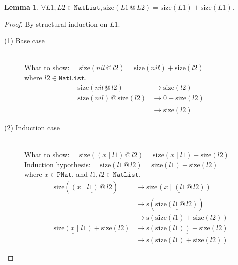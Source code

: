 \documentclass[12pt, a4paper]{article}
\newtheorem{lemma}[theorem]{Lemma}
\newcommand{\rel}[1]{\mathrel{#1}}
\newcommand{\rmx}[1]{\mathrm{#1}}
\newcommand{\larrow}{\longrightarrow}
\newcommand{\under}{\underline}
\begin{document}
\begin{lemma}
\label{lm1}
$\forall L1, L2 \in \mathtt{NatList}, \rmx{size}(L1 \rel{@} L2) = \rmx{size}(L1) \rel{+} \rmx{size}(L1)$.
\end{lemma}
\begin{proof}
By structural induction on $L1$.

\begin{description}

\item[(1) Base case]~\\
\noindent
What to show: $\quad \rmx{size}(nil \rel{@} l2) = \rmx{size}(nil) \rel{+} \rmx{size}(l2)$ \\
where $l2 \in \mathtt{NatList}$.
\begin{align*}
\rmx{size}(\under{nil \rel{@} l2})
	&\larrow \rmx{size}(l2) \tag{by @1} \\
\under{\rmx{size}(nil)} \rel{@} \rmx{size}(l2)
	&\larrow \under{0 \rel{+} \rmx{size}(l2)} \tag{by size1} \\
	&\larrow \rmx{size}(l2) \tag{by +1}
\end{align*}

\item[(2) Induction case]~\\
What to show: $\quad \rmx{size}((x \rel{|} l1) \rel{@} l2) = \rmx{size}(x \rel{|} l1) \rel{+} \rmx{size}(l2)$ \\
Induction hypothesis: $\quad \rmx{size}(l1 \rel{@} l2) = \rmx{size}(l1) \rel{+} \rmx{size}(l2)$  \\
where $x \in \mathtt{PNat}$, and $l1, l2 \in \mathtt{NatList}$.
\begin{align*}
\rmx{size}(\under{(x \rel{|} l1) \rel{@} l2})
	&\larrow \under{\rmx{size}(x \rel{|} (l1 \rel{@} l2))} \tag{by @2} \\
	&\larrow \rmx{s}(\under{\rmx{size}(l1 \rel{@} l2)}) \tag{by size2} \\
	&\larrow \rmx{s}(\rmx{size}(l1) \rel{+} \rmx{size}(l2)) \tag{by IH} \\
\under{\rmx{size}(x \rel{|} l1)} \rel{+} \rmx{size}(l2)
	&\larrow \under{\rmx{s}(\rmx{size}(l1)) \rel{+} \rmx{size}(l2)} \tag{by size2} \\
	&\larrow \rmx{s}(\rmx{size}(l1) \rel{+} \rmx{size}(l2)) \tag{by +2}
\end{align*}

\end{description}
\end{proof}
\end{document}
